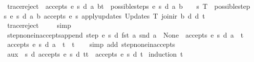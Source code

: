 \begin{isabellebody}
\ trace{\isacharunderscore}reject{\isacharunderscore}{}{\isacharcolon}\ {\isachardoublequoteopen}{\isacharparenleft}{\isasymnot}\ accepts\ e\ s\ d\ {\isacharparenleft}{\isacharparenleft}a{\isacharcomma}\ b{\isacharparenright}{\isacharhash}t{\isacharparenright}{\isacharparenright}\ {\isacharequal}\ {\isacharparenleft}possible{\isacharunderscore}steps\ e\ s\ d\ a\ b\ {\isacharequal}\ {\isacharbraceleft}{\isacharbar}{\isacharbar}{\isacharbraceright}\ {\isasymor}\ {\isacharparenleft}{\isasymforall}{\isacharparenleft}s{\isacharprime}{\isacharcomma}\ T{\isacharparenright}\ {\isacharbar}{\isasymin}{\isacharbar}\ possible{\isacharunderscore}steps\ e\ s\ d\ a\ b{\isachardot}\ {\isasymnot}accepts\ e\ s{\isacharprime}\ {\isacharparenleft}apply{\isacharunderscore}updates\ {\isacharparenleft}Updates\ T{\isacharparenright}\ {\isacharparenleft}join{\isacharunderscore}ir\ b\ d{\isacharparenright}\ d{\isacharparenright}\ t{\isacharparenright}{\isacharparenright}{\isachardoublequoteclose}\isanewline
%
\isadelimproof
\ \ %
\endisadelimproof
%
\isatagproof
{}\isamarkupfalse%
\ trace{\isacharunderscore}reject\ \isanewline
\ \ \isamarkupfalse%
\ simp%
\endisatagproof
{\isafoldproof}%
%
\isadelimproof
\isanewline
%
\endisadelimproof
\isanewline
{}\isamarkupfalse%
\ step{\isacharunderscore}none{\isacharunderscore}inaccepts{\isacharunderscore}append{\isacharcolon}\ {\isachardoublequoteopen}step\ e\ s\ d\ {\isacharparenleft}fst\ a{\isacharparenright}\ {\isacharparenleft}snd\ a{\isacharparenright}\ {\isacharequal}\ None\ {\isasymLongrightarrow}\ {\isasymnot}accepts\ e\ s\ d\ {\isacharparenleft}a\ {\isacharhash}\ t{\isacharparenright}\ {\isasymand}\ {\isasymnot}accepts\ e\ s\ d\ {\isacharparenleft}a\ {\isacharhash}\ t\ {\isacharat}\ t{\isacharprime}{\isacharparenright}{\isachardoublequoteclose}\isanewline
%
\isadelimproof
\ \ %
\endisadelimproof
%
\isatagproof
{}\isamarkupfalse%
\ {\isacharparenleft}simp\ add{\isacharcolon}\ step{\isacharunderscore}none{\isacharunderscore}inaccepts{\isacharparenright}%
\endisatagproof
{\isafoldproof}%
%
\isadelimproof
\isanewline
%
\endisadelimproof
\isanewline
{}\isamarkupfalse%
\ aux{}{\isacharcolon}\ {\isachardoublequoteopen}{\isasymforall}\ s\ d{\isachardot}\ accepts\ e\ s\ d\ {\isacharparenleft}t{\isacharat}t{\isacharprime}{\isacharparenright}\ {\isasymlongrightarrow}\ accepts\ e\ s\ d\ t{\isachardoublequoteclose}\isanewline
%
\isadelimproof
%
\endisadelimproof
%
\isatagproof
{}\isamarkupfalse%
\ {\isacharparenleft}induction\ t{\isacharparenright}\isanewline

\end{isabellebody}
